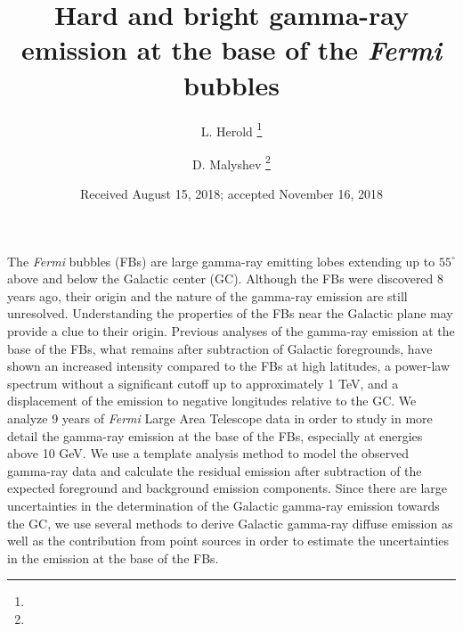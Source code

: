 \documentclass[preprint]{aa}
\newcommand{\Fermi}{\textsl{Fermi}\xspace}
\begin{document}
 


   \title{Hard and bright gamma-ray emission at the base of the \Fermi bubbles}



   \author{L. Herold \thanks{}
          \and
          D. Malyshev \thanks{}
          }


   \date{Received August 15, 2018; accepted November 16, 2018}

 
  \abstract
   {The \Fermi bubbles (FBs) are large gamma-ray emitting lobes extending up to $55^\circ$ above and below the Galactic center (GC).
   Although the FBs were discovered 8 years ago, their origin and the nature of the gamma-ray emission are still unresolved.
   Understanding the properties of the FBs near the Galactic plane may provide a clue to %
   their origin.
   Previous analyses of the gamma-ray emission at the base of the FBs, what remains after subtraction of Galactic foregrounds,
   have shown an increased intensity compared to the FBs at high latitudes, 
   a power-law spectrum without a significant cutoff up to approximately 1 TeV, 
   and a displacement of the emission to negative longitudes relative to the GC.
   }
   {We analyze 9 years of  \Fermi Large Area Telescope data in order to study in more detail the gamma-ray emission at the base of the FBs,
   especially at energies above 10 GeV.
   }
   { We use a template analysis method to model the observed gamma-ray data 
   and calculate the residual emission after subtraction of the expected foreground and background emission components.
   Since there are large uncertainties in the determination of the Galactic gamma-ray emission towards the GC,
   we use several methods to derive Galactic gamma-ray diffuse emission as well as the contribution from point sources
   in order to estimate the uncertainties in the emission at the base of the FBs.
   }
\end{document}
